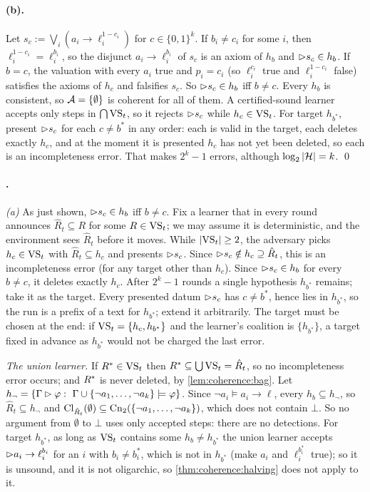 \paragraph{(b).} Let $s_c:=\bigvee_i(a_i\to\ell_i^{1-c_i})$ for $c\in\{0,1\}^k$. If $b_i\neq c_i$ for some $i$, then $\ell_i^{1-c_i}=\ell_i^{b_i}$, so the disjunct $a_i\to\ell_i^{b_i}$ of $s_c$ is an axiom of $h_b$ and $\rhd s_c\in h_b$. If $b=c$, the valuation with every $a_i$ true and $p_i=c_i$ (so $\ell_i^{c_i}$ true and $\ell_i^{1-c_i}$ false) satisfies the axioms of $h_c$ and falsifies $s_c$. So $\rhd s_c\in h_b$ iff $b\neq c$. Every $h_b$ is consistent, so $\mathcal{A}=\{\emptyset\}$ is coherent for all of them. A certified-sound learner accepts only steps in $\bigcap\mathrm{VS}_t$, so it rejects $\rhd s_c$ while $h_c\in\mathrm{VS}_t$. For target $h_{b^*}$, present $\rhd s_c$ for each $c\neq b^*$ in any order: each is valid in the target, each deletes exactly $h_c$, and at the moment it is presented $h_c$ has not yet been deleted, so each is an incompleteness error. That makes $2^k-1$ errors, although $\log_2|\mathcal{H}|=k$. \qed

\paragraph{.} \emph{(a)} As just shown, $\rhd s_c\in h_b$ iff $b\neq c$. Fix a learner that in every round announces $\hat R_t\subseteq R$ for some $R\in\mathrm{VS}_t$; we may assume it is deterministic, and the environment sees $\hat R_t$ before it moves. While $|\mathrm{VS}_t|\ge2$, the adversary picks $h_c\in\mathrm{VS}_t$ with $\hat R_t\subseteq h_c$ and presents $\rhd s_c$. Since ${\rhd s_c}\notin h_c\supseteq\hat R_t$, this is an incompleteness error (for any target other than $h_c$). Since $\rhd s_c\in h_b$ for every $b\neq c$, it deletes exactly $h_c$. After $2^k-1$ rounds a single hypothesis $h_{b^*}$ remains; take it as the target. Every presented datum $\rhd s_c$ has $c\neq b^*$, hence lies in $h_{b^*}$, so the run is a prefix of a text for $h_{b^*}$; extend it arbitrarily. The target must be chosen at the end: if $\mathrm{VS}_t=\{h_c,h_{b^*}\}$ and the learner's coalition is $\{h_{b^*}\}$, a target fixed in advance as $h_{b^*}$ would not be charged the last error.

\emph{The union learner.} If $R^{*}\in\mathrm{VS}_t$ then $R^{*}\subseteq\bigcup\mathrm{VS}_t=\hat R_t$, so no incompleteness error occurs; and $R^{*}$ is never deleted, by \cref{lem:coherence:bag}. Let $h_\neg=\{\Gamma\rhd\varphi:\ \Gamma\cup\{\neg a_1,\dots,\neg a_k\}\models\varphi\}$. Since $\neg a_i\models a_i\to\ell$, every $h_b\subseteq h_\neg$, so $\hat R_t\subseteq h_\neg$ and $\mathrm{Cl}_{\hat R_t}(\emptyset)\subseteq\mathrm{Cn}_2(\{\neg a_1,\dots,\neg a_k\})$, which does not contain $\bot$. So no argument from $\emptyset$ to $\bot$ uses only accepted steps: there are no detections. For target $h_{b^*}$, as long as $\mathrm{VS}_t$ contains some $h_b\neq h_{b^*}$ the union learner accepts $\rhd a_i\to\ell_i^{b_i}$ for an $i$ with $b_i\neq b^*_i$, which is not in $h_{b^*}$ (make $a_i$ and $\ell_i^{b^*_i}$ true); so it is unsound, and it is not oligarchic, so \cref{thm:coherence:halving} does not apply to it.

